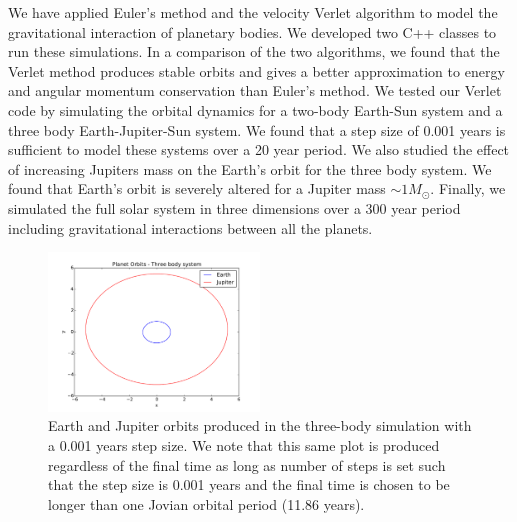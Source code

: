 \documentclass[10pt,showpacs,preprintnumbers,footinbib,amsmath,amssymb,aps,prl,twocolumn,groupedaddress,superscriptaddress,showkeys]{revtex4-1}
\begin{document}
We have applied Euler's method and the velocity Verlet algorithm to
model the gravitational interaction of planetary bodies. We developed
two C++ classes to run these simulations. In a comparison of the two
algorithms, we found that the Verlet method produces stable
orbits and gives a better approximation to energy and angular momentum
conservation than Euler's method. We tested our Verlet code by
simulating the orbital dynamics for a two-body Earth-Sun system
and a three body Earth-Jupiter-Sun system. We found that a step size
of 0.001 years is sufficient to model these systems over a 20 year period.
We also studied the effect of increasing Jupiters mass on the Earth's orbit
for the three body system. We found that Earth's orbit is severely altered
for a Jupiter mass $\sim 1 M_{\odot}$. Finally, we simulated the full solar
system in three dimensions over a 300 year period including gravitational
interactions between all the planets.


\clearpage


\begin{figure}
\centering
	\includegraphics[width=0.5\textwidth]{figures/sej20.pdf}
	\caption{Earth and Jupiter orbits produced in the three-body
	simulation with a 0.001 years step size. We note that this
	same plot is produced regardless of the final time as long
	as number of steps is set such that the step size is 0.001 years
	and the final time is chosen
	to be longer than one Jovian orbital period (11.86 years).}
	\label{fig:sej20}
\end{figure}
\end{document}
